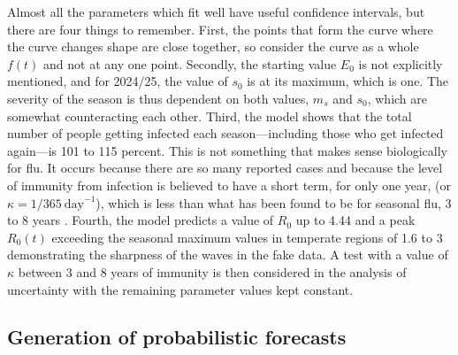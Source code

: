 \documentclass[12pt,a4paper]{article}
\theoremstyle{definition}
\theoremstyle{remark}
\begin{document}
Almost all the parameters which fit well have useful confidence intervals, but there are four things to remember. First, the points that form the curve where the curve changes shape are close together, so consider the curve as a whole \(f(t)\) and not at any one point. Secondly, the starting value \(E_0\) is not explicitly mentioned, and for 2024/25, the value of \(s_0\) is at its maximum, which is one. The severity of the season is thus dependent on both values, \(m_s\) and \(s_0\), which are somewhat counteracting each other. Third, the model shows that the total number of people getting infected each season—including those who get infected again—is 101 to 115 percent. This is not something that makes sense biologically for flu. It occurs because there are so many reported cases and because the level of immunity from infection is believed to have a short term, for only one year, (or \(\kappa = 1/365\ \text{day}^{-1}\)), which is less than what has been found to be for seasonal flu, 3 to 8 years \cite{truscott2012essential}. Fourth, the model predicts a value of \(R_0\) up to 4.44 and a peak \(R_0(t)\) exceeding the seasonal maximum values in temperate regions of 1.6 to 3 \cite{truscott2012essential} demonstrating the sharpness of the waves in the fake data. A test with a value of \(\kappa\) between 3 and 8 years of immunity is then considered in the analysis of uncertainty with the remaining parameter values kept constant.





\subsection{Generation of probabilistic forecasts}\label{sec:forecast_generation}
\end{document}
